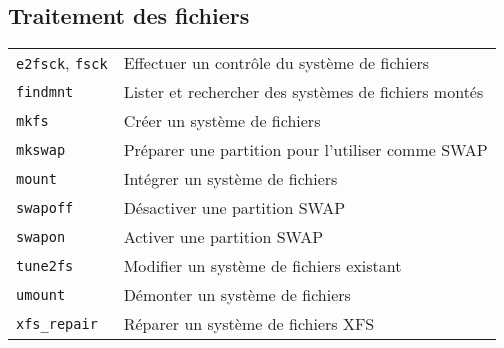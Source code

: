 \documentclass[10pt,a4paper]{article}
\begin{document}
\newpage

\cheatsheet

\begin{multicols}{2} 
\section{Traitement des fichiers}
\begin{tabular}{ p{2.5cm} p{8.5cm} }
  \hline
  \texttt{e2fsck}, \texttt{fsck} & Effectuer un contrôle du système de fichiers \\
  \texttt{findmnt} & Lister et rechercher des systèmes de fichiers montés \\
  \texttt{mkfs} & Créer un système de fichiers \\
  \texttt{mkswap} & Préparer une partition pour l'utiliser comme SWAP \\
  \texttt{mount} & Intégrer un système de fichiers \\
  \texttt{swapoff} & Désactiver une partition SWAP \\
  \texttt{swapon} & Activer une partition SWAP \\
  \texttt{tune2fs} & Modifier un système de fichiers existant \\
  \texttt{umount} & Démonter un système de fichiers \\
  \texttt{xfs\_repair} & Réparer un système de fichiers XFS\\
  \hline
\end{tabular}


\end{multicols}
\end{document}
